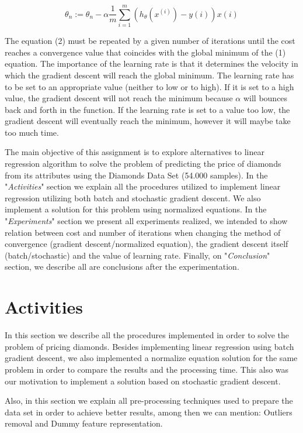 \documentclass[conference]{IEEEtran}
\begin{document}
\begin{equation}
\theta_n := \theta_n - \alpha \frac{1}{m} \sum_{i=1}^{m} (h_\theta(x^(i)) - y(i))x(i)
\end{equation}

The equation (2) must be repeated by a given number of iterations until the cost reaches a convergence value that coincides with the global minimum of the (1) equation. The importance of the learning rate is that it determines the velocity in which the gradient descent will reach the global minimum. The learning rate has to be set to an appropriate value (neither to low or to high). If it is set to a high value, the gradient descent will not reach the minimum because $\alpha$ will bounces back and forth in the function. If the learning rate is set to a value too low, the gradient descent will eventually reach the minimum, however it will maybe take too much time.\par

The main objective of this assignment is to explore alternatives to linear regression algorithm to solve the problem of predicting the price of diamonds from its attributes using the Diamonds Data Set (54.000 samples). In the "\textit{Activities}" section we explain all the procedures utilized to implement linear regression utilizing both batch and stochastic gradient descent. We also implement a solution for this problem using normalized equations. In the "\textit{Experiments}" section we present all experiments realized, we intended to show relation between cost and number of iterations when changing the method of convergence (gradient descent/normalized equation), the gradient descent itself (batch/stochastic) and the value of learning rate. Finally, on "\textit{Conclusion}" section, we describe all are conclusions after the experimentation.\par

\section{Activities}
In this section we describe all the procedures implemented in order to solve the problem of pricing diamonds. Besides implementing linear regression using batch gradient descent, we also implemented a normalize equation solution for the same problem in order to compare the results and the processing time. This also was our motivation to implement a solution based on stochastic gradient descent.\par
Also, in this section we explain all pre-processing techniques used to prepare the data set in order to achieve better results, among then we can mention: Outliers removal and Dummy feature representation.\par
\end{document}

